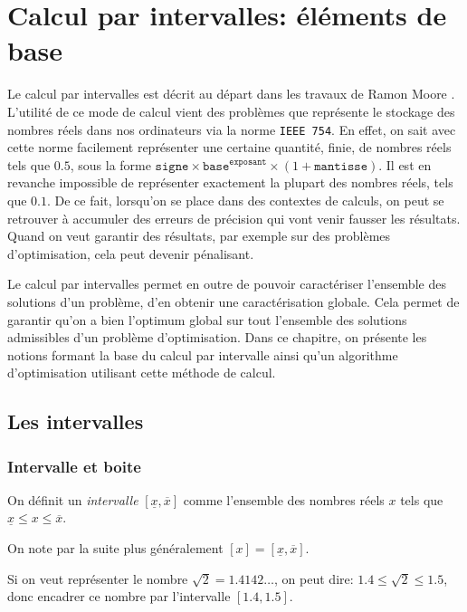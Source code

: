\chapter{Calcul par intervalles: éléments de base}

Le calcul par intervalles est décrit au départ dans les travaux de Ramon Moore \cite{Moore66}. L'utilité de ce mode de calcul vient des problèmes que représente le stockage des nombres réels dans nos ordinateurs via la norme \texttt{IEEE 754}. En effet, on sait avec cette norme facilement représenter une certaine quantité, finie, de nombres réels tels que $0.5$, sous la forme $\texttt{signe} \times \texttt{base}^{\texttt{exposant}} \times (1 + \texttt{mantisse})$. Il est en revanche impossible de représenter exactement la plupart des nombres réels, tels que $0.1$. De ce fait, lorsqu'on se place dans des contextes de calculs, on peut se retrouver à accumuler des erreurs de précision qui vont venir fausser les résultats. Quand on veut garantir des résultats, par exemple sur des problèmes d'optimisation, cela peut devenir pénalisant.

Le calcul par intervalles permet en outre de pouvoir caractériser l'ensemble des solutions d'un problème, d'en obtenir une caractérisation globale. Cela permet de garantir qu'on a bien l'optimum global sur tout l'ensemble des solutions admissibles d'un problème d'optimisation. Dans ce chapitre, on présente les notions formant la base du calcul par intervalle ainsi qu'un algorithme d'optimisation utilisant cette méthode de calcul.


\section{Les intervalles}
\subsection{Intervalle et boite}

\begin{definition}
  On définit un \textit{intervalle} $[\underline{x}, \overline{x}]$ comme l'ensemble des nombres réels $x$ tels que $\underline{x} \leq x \leq \overline{x}$.
\end{definition}

On note par la suite plus généralement $[x] = [\underline{x}, \overline{x}]$.

\begin{ex}
  Si on veut représenter le nombre $\sqrt{2} = 1.4142\dots$, on peut dire: $1.4 \leq \sqrt{2} \leq 1.5$, donc encadrer ce nombre par l'intervalle $[1.4, 1.5]$.
\end{ex}

